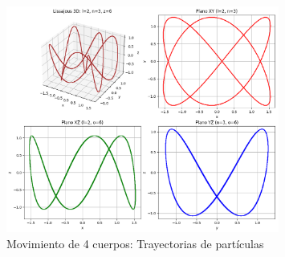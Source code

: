 \documentclass{article}
\begin{document}
\begin{center}
    \begin{figure}[H]
    \centering
    \includegraphics[width=0.8\textwidth]{img/5.png}
    \caption{Movimiento de 4 cuerpos: Trayectorias de partículas}
    \label{fig:salida_consola}
\end{figure}


\end{center}
\end{document}
